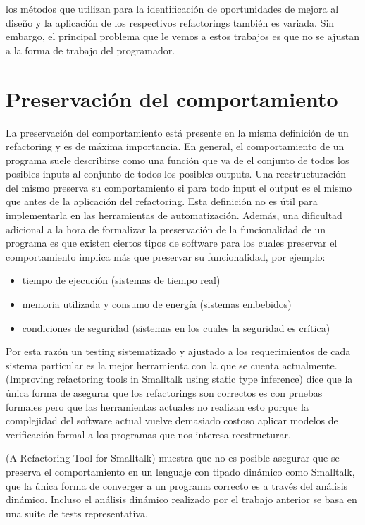 los métodos que utilizan para la identificación de oportunidades de mejora al diseño y la aplicación
de los respectivos refactorings también es variada. Sin embargo, el principal problema que
le vemos a estos trabajos es que no se ajustan a la forma de trabajo del programador.



\section{Preservación del comportamiento}
La preservación del comportamiento está presente en la misma definición de un refactoring y es de
máxima importancia. En general, el comportamiento de un programa suele describirse como una función
que va de el conjunto de todos los posibles inputs al conjunto de todos los posibles outputs. Una
reestructuración del mismo preserva su comportamiento si para todo input el output es el mismo que
antes de la aplicación del refactoring. Esta definición no es útil para implementarla en las
herramientas de automatización.
Además, una dificultad adicional a la hora de formalizar la preservación de la funcionalidad de un
programa es que existen ciertos tipos de software para los cuales preservar el comportamiento
implica más que preservar su funcionalidad, por ejemplo:

\begin{itemize}
    \item tiempo de ejecución (sistemas de tiempo real)
    \item memoria utilizada y consumo de energía (sistemas embebidos) 
    \item condiciones de seguridad (sistemas en los cuales la seguridad es crítica)
\end{itemize}

Por esta razón un testing sistematizado y ajustado a los requerimientos de cada sistema particular
es la mejor herramienta con la que se cuenta actualmente.
(Improving refactoring tools in Smalltalk using static type inference) dice que la única forma de
asegurar que los refactorings son correctos es con pruebas formales pero que las herramientas
actuales no realizan esto porque la complejidad del software actual vuelve demasiado costoso aplicar
modelos de verificación formal a los programas que nos interesa reestructurar.

(A Refactoring Tool for Smalltalk) muestra que no es posible asegurar que se preserva el
comportamiento en un lenguaje con tipado dinámico como Smalltalk, que la única forma de converger a
un programa correcto es a través del análisis dinámico. Incluso el análisis dinámico realizado por
el trabajo anterior se basa en una suite de tests representativa.

